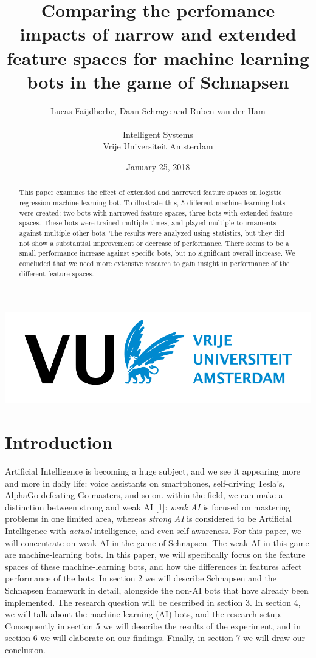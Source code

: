 \documentclass[a4paper,11pt]{article}
\title{Comparing the perfomance impacts of narrow and extended feature spaces for machine learning bots in the game of Schnapsen}
\date{January 25, 2018}
\author{Lucas Faijdherbe, Daan Schrage and Ruben van der Ham\\\\
	\small Intelligent Systems\\
	\small Vrije Universiteit Amsterdam}
\begin{document}
\begin{titlepage}

\centering
\maketitle
\includegraphics[width=0.8\linewidth]{images/vulogo.png}

\end{titlepage}
\clearpage

\tableofcontents
\clearpage




\begin{abstract}
This paper examines the effect of extended and narrowed feature spaces on logistic regression machine learning bot. To illustrate this, 5 different machine learning bots were created: two bots with narrowed feature spaces, three bots with extended feature spaces. These bots were trained multiple times, and played multiple tournaments against multiple other bots. The results were analyzed using statistics, but they did not show a substantial improvement or decrease of performance. There seems to be a small performance increase against specific bots, but no significant overall increase. We concluded that we need more extensive research to gain insight in performance of the different feature spaces.
\end{abstract}

\section{Introduction}
Artificial Intelligence is becoming a huge subject, and we see it appearing more and more in daily life: voice assistants on smartphones, self-driving Tesla's, AlphaGo defeating Go masters, and so on. within the field, we can make a distinction between strong and weak AI [1]: \textit{weak AI} is focused on mastering problems in one limited area, whereas \textit{strong AI} is considered to be Artificial Intelligence with \textit{actual} intelligence, and even self-awareness. For this paper, we will concentrate on weak AI in the game of Schnapsen. The weak-AI in this game are machine-learning bots. In this paper, we will specifically focus on the feature spaces of these machine-learning bots, and how the differences in features affect performance of the bots. In section 2 we will describe Schnapsen and the Schnapsen framework in detail, alongside the non-AI bots that have already been implemented. The research question will be described in section 3. In section 4, we will talk about the machine-learning (AI) bots, and the research setup. Consequently in section 5 we will describe the results of the experiment, and in section 6 we will elaborate on our findings. Finally, in section 7 we will draw our conclusion.
\end{document}
